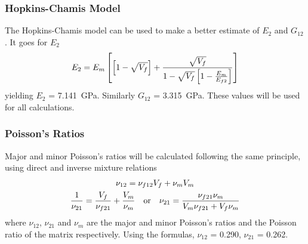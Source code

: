 \documentclass[a4paper,twosided,12pt,DIV12]{scrartcl}
\begin{document}
\subsubsection{Hopkins-Chamis Model}
%
The Hopkins-Chamis model can be used to make a better estimate of $E_2$ and
$G_{12}$. It goes for $E_2$
%
\begin{equation}
  E_{2} = E_m\left[\left[1-\sqrt{V_f}\right]+\frac{\sqrt{V_f}}{1-\sqrt{V_f}\left[1-\frac{E_m}{E_{f2}}\right]}\right]
\end{equation}
%
yielding $E_2$ = \SI{7.141}{GPa}. Similarly $G_{12}$ = \SI{3.315}{GPa}.
%
These values will be used for all calculations.
%
%
\subsubsection{Poisson's Ratios}
%
Major and minor Poisson's ratios will be calculated following the same
principle, using direct and inverse mixture relations
%
\begin{gather}
  \nu_{12} = \nu_{f12} V_f + \nu_m V_m\\
  \frac{1}{\nu_{21}} = \frac{V_f}{\nu_{f21}} + \frac{V_m}{\nu_m}
  \quad\textup{or}\quad
  \nu_{21} = \frac{\nu_{f21} \nu_m}{V_m\nu_{f21}+V_f\nu_m}
\end{gather}
%
where $\nu_{12}$, $\nu_{21}$ and $\nu_m$ are the major and minor Poisson's
ratios and the Poisson ratio of the matrix respectively. Using the formulas,
$\nu_{12}$ = 0.290, $\nu_{21}$ = 0.262.
%
\end{document}
